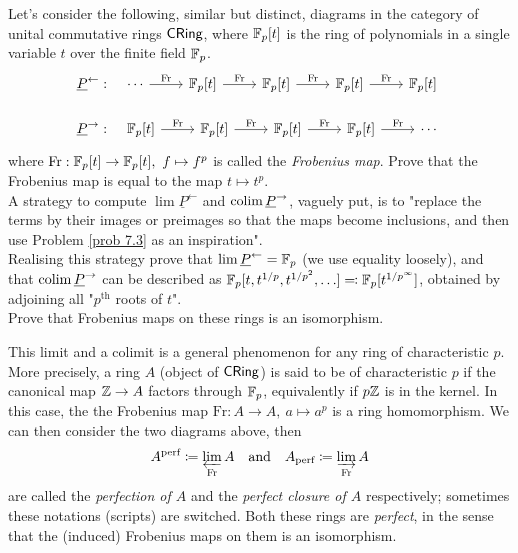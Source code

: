 \begin{problem}\label{prob 7.4a}
Let's consider the following, similar but distinct, diagrams in the category of unital commutative rings $\mathsf{CRing}$, where $\mathbb F_p[t]$ is the ring of polynomials in a single variable $t$ over the finite field $\mathbb F_p$. 
\begin{align*}
\underline{P}^{\leftarrow}:&\quad \begin{tikzcd}[ampersand replacement=\&]
\cdots \arrow[r, "\mathrm{Fr}"] \& \ff_p[t] \arrow[r,"\mathrm{Fr}"] \& \ff_p[t] \arrow[r,"\mathrm{Fr}"] \& \ff_p[t] \arrow[r,"\mathrm{Fr}"] \& \ff_p[t]
\end{tikzcd}\\[1em]
\underline{P}^{\to}:&\quad \begin{tikzcd}[ampersand replacement=\&]
\ff_p[t] \arrow[r, "\mathrm{Fr}"] \& \ff_p[t] \arrow[r,"\mathrm{Fr}"] \& \ff_p[t] \arrow[r,"\mathrm{Fr}"] \& \ff_p[t] \arrow[r,"\mathrm{Fr}"] \& \cdots
\end{tikzcd}
\end{align*}
where $\mathrm{Fr}:\mathbb F_p[t] \to \mathbb F_p[t],\ f \mapsto f^p$ is called the \emph{Frobenius map}. Prove that the Frobenius map is equal to the map $t \mapsto t^p$.\\[1em]
A strategy to compute $\lim \underline{P}^{\leftarrow}$ and $\operatorname{colim} \underline{P}^\to$, vaguely put, is to "replace the terms by their images or preimages so that the maps become inclusions, and then use Problem \ref{prob 7.3} as an inspiration".\\[0.5em]
Realising this strategy prove that $\lim \underline{P}^{\leftarrow} = \mathbb F_p$ (we use equality loosely), and that $\operatorname{colim} \underline{P}^\to$ can be described as $\mathbb F_p[t,t^{1/p},t^{1/p^2},\ldots] \eqqcolon \mathbb F_p[t^{1/p^\infty}]$, obtained by adjoining all "$p^{\text{th}}$ roots of $t$".\\[0.5em]
Prove that Frobenius maps on these rings is an isomorphism.

\vspace*{0.1in}

\begin{remark}
This limit and a colimit is a general phenomenon for any ring of characteristic $p$. More precisely, a ring $A$ (object of $\mathsf{CRing}$) is said to be of characteristic $p$ if the canonical map $\mathbb Z \to A$ factors through $\mathbb F_p$, equivalently if $p\mathbb Z$ is in the kernel. In this case, the the Frobenius map $\mathrm{Fr}:A \to A,\ a \mapsto a^p$ is a ring homomorphism. We can then consider the two diagrams above, then \[A^{\text{perf}}\coloneqq \varprojlim_{\mathrm{Fr}}A \quad \text{and} \quad A_{\text{perf}}\coloneqq \varinjlim_{\mathrm{Fr}}A\]
are called the \emph{perfection of $A$} and the \emph{perfect closure of $A$} respectively; sometimes these notations (scripts) are switched. Both these rings are \emph{perfect}, in the sense that the (induced) Frobenius maps on them is an isomorphism.
\end{remark}
\end{problem}

